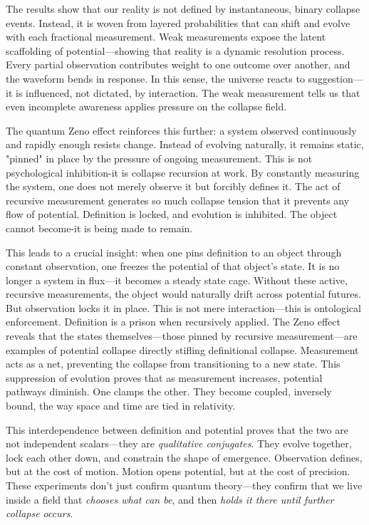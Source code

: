 The results show that our reality is not defined by instantaneous, binary collapse events. Instead, it is woven from layered probabilities that can shift and evolve with each fractional measurement. Weak measurements expose the latent scaffolding of potential---showing that reality is a dynamic resolution process. Every partial observation contributes weight to one outcome over another, and the waveform bends in response. In this sense, the universe reacts to suggestion---it is influenced, not dictated, by interaction. The weak measurement tells us that even incomplete awareness applies pressure on the collapse field.

The quantum Zeno effect reinforces this further: a system observed continuously and rapidly enough resists change. Instead of evolving naturally, it remains static, "pinned" in place by the pressure of ongoing measurement. This is not psychological inhibition-it is collapse recursion at work. By constantly measuring the system, one does not merely observe it but forcibly defines it. The act of recursive measurement generates so much collapse tension that it prevents any flow of potential. Definition is locked, and evolution is inhibited. The object cannot become-it is being made to remain.

This leads to a crucial insight: when one pins definition to an object through constant observation, one freezes the potential of that object's state. It is no longer a system in flux---it becomes a steady state cage. Without these active, recursive measurements, the object would naturally drift across potential futures. But observation locks it in place. This is not mere interaction---this is ontological enforcement. Definition is a prison when recursively applied. The Zeno effect reveals that the states themselves---those pinned by recursive measurement---are examples of potential collapse directly stifling definitional collapse. Measurement acts as a net, preventing the collapse from transitioning to a new state. This suppression of evolution proves that as measurement increases, potential pathways diminish. One clamps the other. They become coupled, inversely bound, the way space and time are tied in relativity. 

This interdependence between definition and potential proves that the two are not independent scalars---they are \textit{qualitative conjugates}. They evolve together, lock each other down, and constrain the shape of emergence. Observation defines, but at the cost of motion. Motion opens potential, but at the cost of precision. These experiments don’t just confirm quantum theory---they confirm that we live inside a field that \textit{chooses what can be}, and then \textit{holds it there until further collapse occurs}.

